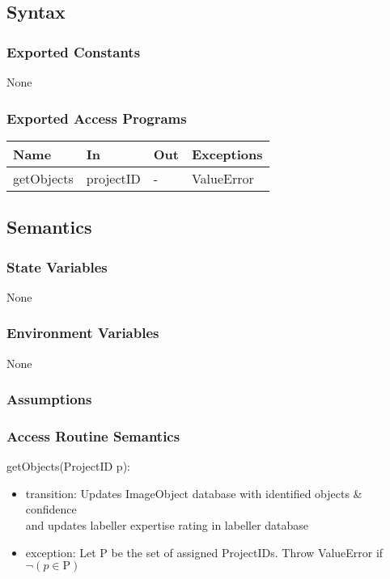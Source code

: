 \documentclass[12pt, titlepage]{article}
\begin{document}
  \subsection{Syntax}


  
  \subsubsection{Exported Constants}
  None
  \subsubsection{Exported Access Programs}
  
  \begin{center}
  \begin{tabular}{p{2cm} p{4cm} p{4cm} p{2cm}}
  \hline
  \textbf{Name} & \textbf{In} & \textbf{Out} & \textbf{Exceptions} \\
  \hline
  getObjects & projectID & - & ValueError \\
  
  \end{tabular}
  \end{center}
  
  \subsection{Semantics}
  
  \subsubsection{State Variables}
  
 None
  
  \subsubsection{Environment Variables}
  
  None
  
  \subsubsection{Assumptions}
  
  
  \subsubsection{Access Routine Semantics}
  
  \noindent getObjects(ProjectID p):
  \begin{itemize}
  \item transition: Updates ImageObject database with identified objects \& confidence\\
  and updates labeller expertise rating in labeller database
  \item exception: Let P be the set of assigned ProjectIDs. Throw ValueError if $\neg (p \in \text{P})$\\
  \end{itemize}
\end{document}

